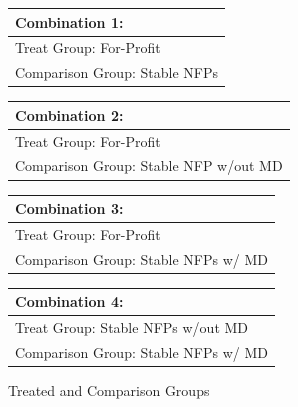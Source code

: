 \documentclass[12pt]{article}
\begin{document}
\begin{figure}[ht!]
    \begin{center}
    \caption{\label{fig:spec}Treated and Comparison Groups}
 \begin{tabular}{| m{18em} |}
 \hline
 Combination 1:\\ [0.5ex]
 \hline\hline 
 \vspace{2mm}
 Treat Group: \hspace{23.5mm} For-Profit \\
 \vspace{2mm} 
 Comparison Group: \hspace{11.5mm} Stable NFPs  \\
 [1ex]
 \hline
 \end{tabular}
\hfil   %
 \begin{tabular}{|m{18em}|}
 \hline
 Combination 2:\\ [0.5ex]
 \hline\hline
 \vspace{2mm}
 Treat Group: \hspace{13.5mm} For-Profit \\
 \vspace{2mm}
 Comparison Group: \hspace{1.5mm} Stable NFP w/out MD  \\
 [1ex]
 \hline
 \end{tabular}
 
\medskip

\vspace{2mm}


  \begin{tabular}{|m{18em}|}
 \hline
 Combination 3:\\ [0.5ex]
 \hline\hline
 \vspace{2mm}
 Treat Group: \hspace{17mm} For-Profit \\
 \vspace{2mm}
 Comparison Group: \hspace{5mm} Stable NFPs w/ MD  \\
 [1ex]
 \hline
 \end{tabular}
\hfil   %
  \begin{tabular}{|m{18em}|}
 \hline
 Combination 4:\\ [0.5ex]
 \hline\hline
 \vspace{2mm}
 Treat Group:  \hspace{13mm} Stable NFPs w/out MD \\
 \vspace{2mm}
 Comparison Group:  \hspace{1mm} Stable NFPs w/ MD  \\
 [1ex]
 \hline
 \end{tabular}
 \end{center}
 \end{figure}
\end{document}
